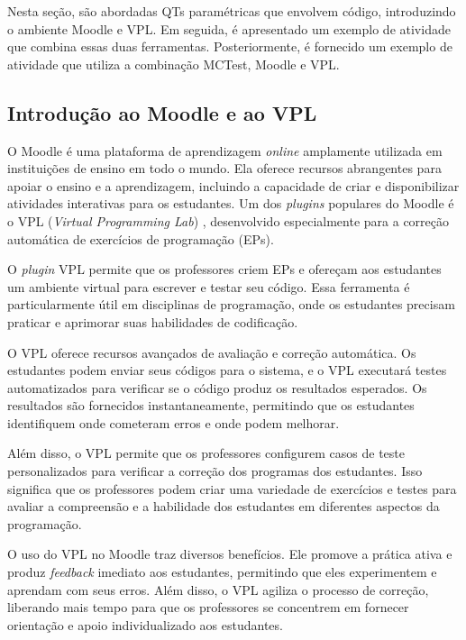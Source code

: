 Nesta seção, são abordadas QTs paramétricas que envolvem código, introduzindo o ambiente Moodle e VPL. Em seguida, é apresentado um exemplo de atividade que combina essas duas ferramentas. Posteriormente, é fornecido um exemplo de atividade que utiliza a combinação MCTest, Moodle e VPL.

\subsection{Introdução ao Moodle e ao VPL}

O Moodle é uma plataforma de aprendizagem \textit{online} amplamente utilizada em instituições de ensino em todo o mundo. Ela oferece recursos abrangentes para apoiar o ensino e a aprendizagem, incluindo a capacidade de criar e disponibilizar atividades interativas para os estudantes. Um dos \textit{plugins} populares do Moodle é o VPL (\textit{Virtual Programming Lab}) \cite{rodriguez2012virtual}, desenvolvido especialmente para a correção automática de exercícios de programação (EPs).

O \textit{plugin} VPL permite que os professores criem EPs e ofereçam aos estudantes um ambiente virtual para escrever e testar seu código. Essa ferramenta é particularmente útil em disciplinas de programação, onde os estudantes precisam praticar e aprimorar suas habilidades de codificação.

O VPL oferece recursos avançados de avaliação e correção automática. Os estudantes podem enviar seus códigos para o sistema, e o VPL executará testes automatizados para verificar se o código produz os resultados esperados. Os resultados são fornecidos instantaneamente, permitindo que os estudantes identifiquem onde cometeram erros e onde podem melhorar.

Além disso, o VPL permite que os professores configurem casos de teste personalizados para verificar a correção dos programas dos estudantes. Isso significa que os professores podem criar uma variedade de exercícios e testes para avaliar a compreensão e a habilidade dos estudantes em diferentes aspectos da programação.

O uso do VPL no Moodle traz diversos benefícios. Ele promove a prática ativa e produz \textit{feedback} imediato aos estudantes, permitindo que eles experimentem e aprendam com seus erros. Além disso, o VPL agiliza o processo de correção, liberando mais tempo para que os professores se concentrem em fornecer orientação e apoio individualizado aos estudantes.

